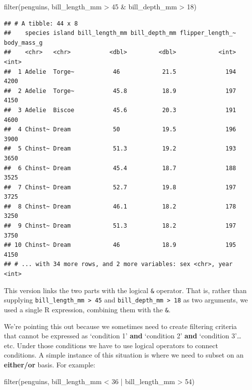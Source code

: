 \documentclass[
]{book}
\newenvironment{Shaded}{\begin{snugshade}}{\end{snugshade}}
\newcommand{\DecValTok}[1]{\textcolor[rgb]{0.00,0.00,0.81}{#1}}
\newcommand{\FunctionTok}[1]{\textcolor[rgb]{0.00,0.00,0.00}{#1}}
\newcommand{\NormalTok}[1]{#1}
\newcommand{\SpecialCharTok}[1]{\textcolor[rgb]{0.00,0.00,0.00}{#1}}
\begin{document}
\begin{Shaded}
\begin{Highlighting}[]
\FunctionTok{filter}\NormalTok{(penguins, bill\_length\_mm }\SpecialCharTok{\textgreater{}} \DecValTok{45} \SpecialCharTok{\&}\NormalTok{ bill\_depth\_mm }\SpecialCharTok{\textgreater{}} \DecValTok{18}\NormalTok{)}
\end{Highlighting}
\end{Shaded}

\begin{verbatim}
## # A tibble: 44 x 8
##    species island bill_length_mm bill_depth_mm flipper_length_~ body_mass_g
##    <chr>   <chr>           <dbl>         <dbl>            <int>       <int>
##  1 Adelie  Torge~           46            21.5              194        4200
##  2 Adelie  Torge~           45.8          18.9              197        4150
##  3 Adelie  Biscoe           45.6          20.3              191        4600
##  4 Chinst~ Dream            50            19.5              196        3900
##  5 Chinst~ Dream            51.3          19.2              193        3650
##  6 Chinst~ Dream            45.4          18.7              188        3525
##  7 Chinst~ Dream            52.7          19.8              197        3725
##  8 Chinst~ Dream            46.1          18.2              178        3250
##  9 Chinst~ Dream            51.3          18.2              197        3750
## 10 Chinst~ Dream            46            18.9              195        4150
## # ... with 34 more rows, and 2 more variables: sex <chr>, year <int>
\end{verbatim}

This version links the two parts with the logical \texttt{\&} operator. That is, rather than supplying \texttt{bill\_length\_mm\ \textgreater{}\ 45} and \texttt{bill\_depth\_mm\ \textgreater{}\ 18} as two arguments, we used a single R expression, combining them with the \texttt{\&}.

We're pointing this out because we sometimes need to create filtering criteria that cannot be expressed as `condition 1' \textbf{and} `condition 2' \textbf{and} `condition 3'\ldots{} etc. Under those conditions we have to use logical operators to connect conditions. A simple instance of this situation is where we need to subset on an \textbf{either/or} basis. For example:

\begin{Shaded}
\begin{Highlighting}[]
\FunctionTok{filter}\NormalTok{(penguins, bill\_length\_mm }\SpecialCharTok{\textless{}} \DecValTok{36} \SpecialCharTok{|}\NormalTok{ bill\_length\_mm }\SpecialCharTok{\textgreater{}} \DecValTok{54}\NormalTok{)}
\end{Highlighting}
\end{Shaded}
\end{document}
